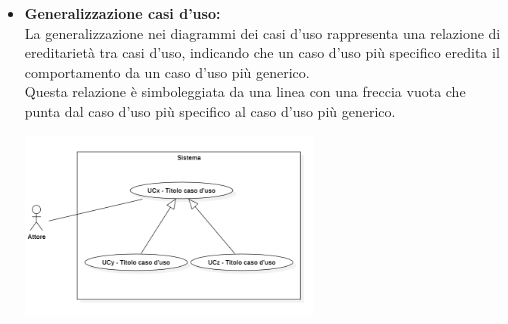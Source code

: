 \begin{itemize}
\begin{itemize}
        \item \textbf{Generalizzazione casi d'uso:} \\
        La generalizzazione nei diagrammi dei casi d'uso rappresenta una relazione di ereditarietà tra casi d'uso, indicando che un caso d'uso più specifico eredita il comportamento da un caso d'uso più generico. \\
        Questa relazione è simboleggiata da una linea con una freccia vuota che punta dal caso d'uso più specifico al caso d'uso più generico.
        \begin{minipage}[t]{\linewidth}
            \centering
            \includegraphics[width=0.6\textwidth]{../Images/NormeDiProgetto/GeneralizzazioneUC.PNG}
        \end{minipage}
    \end{itemize}

\end{itemize}

